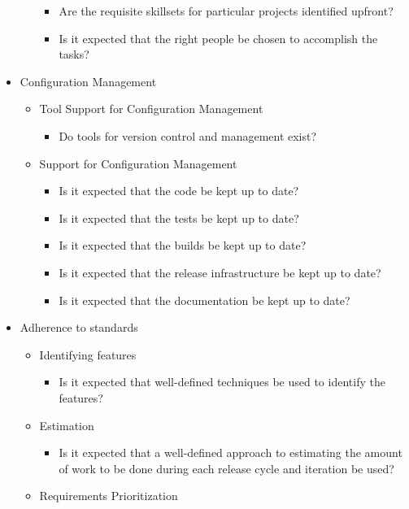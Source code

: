 \begin{itemize}
\begin{itemize}
\begin{itemize}
					\item Are the requisite skillsets for particular projects identified upfront?
					\item Is it expected that the right people be chosen to accomplish the tasks?
				\end{itemize}
		\end{itemize}
	\item Configuration Management
		\begin{itemize}
			\item Tool Support for Configuration Management
				\begin{itemize}
					\item Do tools for version control and management exist?
				\end{itemize}
			\item Support for Configuration Management
				\begin{itemize}
					\item Is it expected that the code be kept up to date?
					\item Is it expected that the tests be kept up to date?
					\item Is it expected that the builds be kept up to date?
					\item Is it expected that the release infrastructure be kept up to date?
					\item Is it expected that the documentation be kept up to date?
				\end{itemize}
		\end{itemize}
	\item Adherence to standards
		\begin{itemize}
			\item Identifying features
				\begin{itemize}
					\item Is it expected that well-defined techniques be used to identify the features?
					\end{itemize}
			\item Estimation
				\begin{itemize}
					\item Is it expected that a well-defined approach to estimating the amount of work to be done during each release cycle and iteration be used?
				\end{itemize}
			\item Requirements Prioritization

\end{itemize}
\end{itemize}
